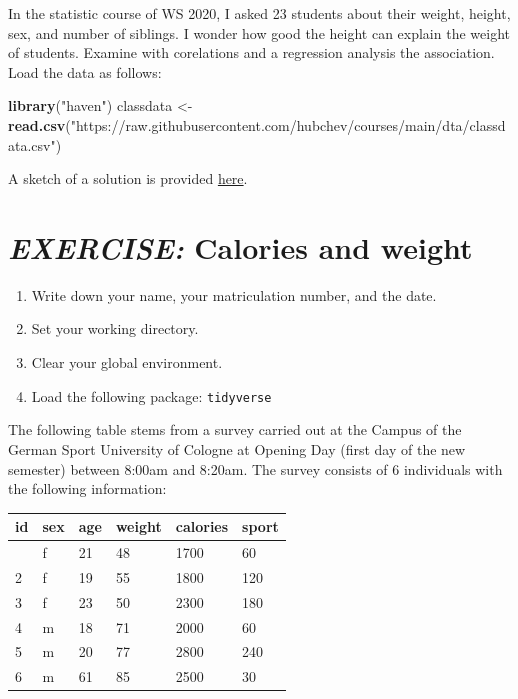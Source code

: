 \documentclass[
  12pt,
  oneside]{book}
\newenvironment{Shaded}{\begin{snugshade}}{\end{snugshade}}
\newcommand{\FunctionTok}[1]{\textcolor[rgb]{0.13,0.29,0.53}{\textbf{#1}}}
\newcommand{\NormalTok}[1]{#1}
\newcommand{\OtherTok}[1]{\textcolor[rgb]{0.56,0.35,0.01}{#1}}
\newcommand{\StringTok}[1]{\textcolor[rgb]{0.31,0.60,0.02}{#1}}
\providecommand{\tightlist}{%
  \setlength{\itemsep}{0pt}\setlength{\parskip}{0pt}}
\begin{document}
In the statistic course of WS 2020, I asked 23 students about their weight, height, sex, and number of siblings. I wonder how good the height can explain the weight of students. Examine with corelations and a regression analysis the association. Load the data as follows:

\begin{Shaded}
\begin{Highlighting}[]
\FunctionTok{library}\NormalTok{(}\StringTok{"haven"}\NormalTok{)}
\NormalTok{classdata }\OtherTok{\textless{}{-}} \FunctionTok{read.csv}\NormalTok{(}\StringTok{"https://raw.githubusercontent.com/hubchev/courses/main/dta/classdata.csv"}\NormalTok{)}
\end{Highlighting}
\end{Shaded}

A sketch of a solution is provided \href{https://raw.githubusercontent.com/hubchev/courses/main/scr/regress_lecture.R}{here}.

\hypertarget{exercise-calories-and-weight}{%
\section*{\texorpdfstring{\emph{EXERCISE:} Calories and weight}{EXERCISE: Calories and weight}}\label{exercise-calories-and-weight}}

\begin{enumerate}
\def\labelenumi{\alph{enumi})}
\tightlist
\item
  Write down your name, your matriculation number, and the date.
\item
  Set your working directory.
\item
  Clear your global environment.
\item
  Load the following package: \texttt{tidyverse}
\end{enumerate}

The following table stems from a survey carried out at the Campus of the German Sport University of Cologne at Opening Day (first day of the new semester) between 8:00am and 8:20am. The survey consists of 6 individuals with the following information:

\begin{longtable}[]{@{}llllll@{}}
\toprule\noalign{}
id & sex & age & weight & calories & sport \\
\midrule\noalign{}
\endhead
\bottomrule\noalign{}
\endlastfoot
1 & f & 21 & 48 & 1700 & 60 \\
2 & f & 19 & 55 & 1800 & 120 \\
3 & f & 23 & 50 & 2300 & 180 \\
4 & m & 18 & 71 & 2000 & 60 \\
5 & m & 20 & 77 & 2800 & 240 \\
6 & m & 61 & 85 & 2500 & 30 \\
\end{longtable}
\end{document}
